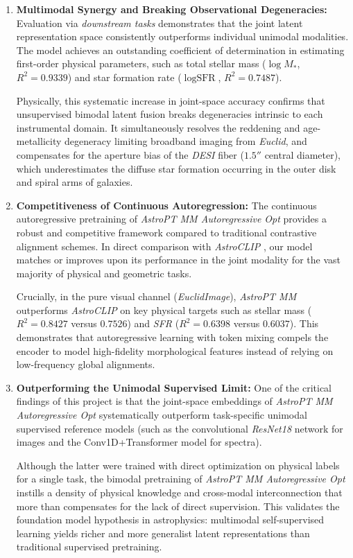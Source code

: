 \begin{enumerate}
	\item \textbf{Multimodal Synergy and Breaking Observational Degeneracies:} 
	Evaluation via \textit{downstream tasks} demonstrates that the joint latent representation space consistently outperforms individual unimodal modalities. The model achieves an outstanding coefficient of determination in estimating first-order physical parameters, such as total stellar mass ($\log M_*$, $R^2 = 0.9339$) and star formation rate ($\log\text{SFR}$, $R^2 = 0.7487$). 
	
	Physically, this systematic increase in joint-space accuracy confirms that unsupervised bimodal latent fusion breaks degeneracies intrinsic to each instrumental domain. It simultaneously resolves the reddening and age-metallicity degeneracy limiting broadband imaging from \textit{Euclid}, and compensates for the aperture bias of the \textit{\gls{DESI}} fiber ($1.5''$ central diameter), which underestimates the diffuse star formation occurring in the outer disk and spiral arms of galaxies.
	
	\item \textbf{Competitiveness of Continuous Autoregression:} 
	The continuous autoregressive pretraining of \textit{AstroPT MM Autoregressive Opt} provides a robust and competitive framework compared to traditional contrastive alignment schemes. In direct comparison with \textit{AstroCLIP} \autocite{ar:astroclip}, our model matches or improves upon its performance in the joint modality for the vast majority of physical and geometric tasks. 
	
	Crucially, in the pure visual channel (\textit{EuclidImage}), \textit{AstroPT MM} outperforms \textit{AstroCLIP} on key physical targets such as stellar mass ($R^2 = 0.8427$ versus $0.7526$) and \textit{\gls{SFR}} ($R^2 = 0.6398$ versus $0.6037$). This demonstrates that autoregressive learning with token mixing compels the encoder to model high-fidelity morphological features instead of relying on low-frequency global alignments.
	
	\item \textbf{Outperforming the Unimodal Supervised Limit:} 
	One of the critical findings of this project is that the joint-space embeddings of \textit{AstroPT MM Autoregressive Opt} systematically outperform task-specific unimodal supervised reference models (such as the convolutional \textit{ResNet18} network for images and the Conv1D+Transformer model for spectra). 
	
	Although the latter were trained with direct optimization on physical labels for a single task, the bimodal pretraining of \textit{AstroPT MM Autoregressive Opt} instills a density of physical knowledge and cross-modal interconnection that more than compensates for the lack of direct supervision. This validates the foundation model hypothesis in astrophysics: multimodal self-supervised learning yields richer and more generalist latent representations than traditional supervised pretraining.
	

\end{enumerate}

